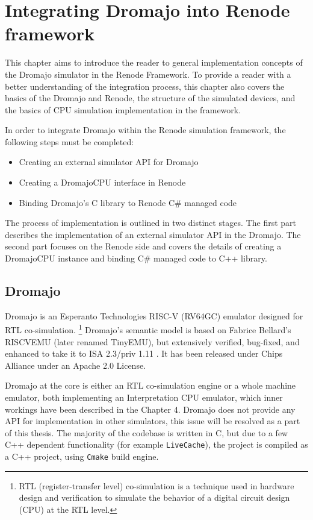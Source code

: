 
\chapter{Integrating Dromajo into Renode framework}

This chapter aims to introduce the reader to general implementation concepts of the Dromajo simulator in the Renode Framework.
To provide a reader with a better understanding of the integration process, this chapter also covers
the basics of the Dromajo and Renode, the structure of the simulated devices, and the basics of CPU simulation
implementation in the framework.

In order to integrate Dromajo within the Renode simulation framework, the following steps must be completed:
\begin{itemize}
    \item{Creating an external simulator API for Dromajo}
    \item{Creating a DromajoCPU interface in Renode}
    \item{Binding Dromajo's C library to Renode C\# managed code}
\end{itemize}

\noindent
The process of implementation is outlined in two distinct stages. The first part describes the implementation of an
external simulator API in the Dromajo. The second part focuses on the Renode side and covers the details of creating a
DromajoCPU instance and binding C\# managed code to C++ library.

\section{Dromajo}

Dromajo is an Esperanto Technologies RISC-V (RV64GC) emulator designed for RTL co-simulation.%
\footnote{RTL (register-transfer level) co-simulation is a technique used in hardware design and verification to
simulate the behavior of a digital circuit design (CPU) at the RTL level.}
Dromajo's semantic model is based on Fabrice Bellard's RISCVEMU (later renamed TinyEMU), but extensively verified,
bug-fixed, and enhanced to take it to ISA 2.3/priv 1.11 \cite{Dromajo}. It has been released under Chips Alliance
\cite{ChipsAlliance} under an Apache 2.0 License.

Dromajo at the core is either an RTL co-simulation engine or a whole machine emulator, both implementing an
Interpretation CPU emulator, which inner workings have been described in the Chapter 4. Dromajo does not provide any API
for implementation in other simulators, this issue will be resolved as a part of this thesis. The majority of the
codebase is written in C, but due to a few C++ dependent functionality (for example \texttt{LiveCache}), the project is
compiled as a C++ project, using \texttt{Cmake} build engine.

